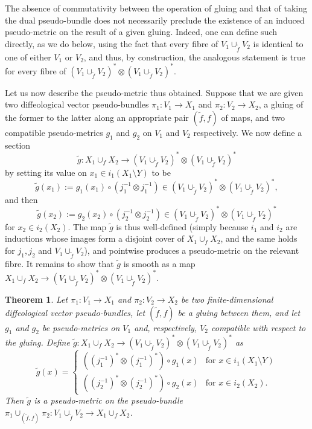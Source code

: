 \documentclass{article}
\newtheorem{thm}[lemma]{Theorem}
\begin{document}
The absence of commutativity between the operation of gluing and that of taking the dual pseudo-bundle does not necessarily preclude the existence of an induced pseudo-metric on the result of a given
gluing. Indeed, one can define such directly, as we do below, using the fact that every fibre of $V_1\cup_{\tilde{f}}V_2$ is identical to one of either $V_1$ or $V_2$, and thus, by construction, the analogous 
statement is true for every fibre of $(V_1\cup_{\tilde{f}}V_2)^*\otimes(V_1\cup_{\tilde{f}}V_2)^*$.

Let us now describe the pseudo-metric thus obtained. Suppose that we are given two diffeological vector pseudo-bundles $\pi_1:V_1\to X_1$ and $\pi_2:V_2\to X_2$, a gluing of the former to the latter along
an appropriate pair $(\tilde{f},f)$ of maps, and two compatible pseudo-metrics $g_1$ and $g_2$ on $V_1$ and $V_2$ respectively. We now define a section
$$\tilde{g}:X_1\cup_f X_2\to(V_1\cup_{\tilde{f}}V_2)^*\otimes(V_1\cup_{\tilde{f}}V_2)^*$$ by setting its value on $x_1\in i_1(X_1\setminus Y)$ to be
$$\tilde{g}(x_1):=g_1(x_1)\circ(j_1^{-1}\otimes j_1^{-1})\in (V_1\cup_{\tilde{f}}V_2)^*\otimes(V_1\cup_{\tilde{f}}V_2)^*,$$ and then
$$\tilde{g}(x_2):=g_2(x_2)\circ(j_2^{-1}\otimes j_2^{-1})\in (V_1\cup_{\tilde{f}}V_2)^*\otimes(V_1\cup_{\tilde{f}}V_2)^*$$ for $x_2\in i_2(X_2)$. The map $\tilde{g}$ is thus well-defined (simply because $i_1$ 
and $i_2$ are inductions whose images form a disjoint cover of $X_1\cup_f X_2$, and the same holds for $j_1,j_2$ and $V_1\cup_{\tilde{f}}V_2$), and pointwise produces a pseudo-metric on the relevant 
fibre. It remains to show that $\tilde{g}$ is smooth as a map $X_1\cup_f X_2\to(V_1\cup_{\tilde{f}}V_2)^*\otimes(V_1\cup_{\tilde{f}}V_2)^*$.

\begin{thm}\label{glued:pseudo:metric:noncommutative:thm}
Let $\pi_1:V_1\to X_1$ and $\pi_2:V_2\to X_2$ be two finite-dimensional diffeological vector pseudo-bundles, let $(\tilde{f},f)$ be a gluing between them, and let $g_1$ and $g_2$ be pseudo-metrics on 
$V_1$ and, respectively, $V_2$ compatible with respect to the gluing. Define $\tilde{g}:X_1\cup_f X_2\to(V_1\cup_{\tilde{f}}V_2)^*\otimes(V_1\cup_{\tilde{f}}V_2)^*$ as
$$\tilde{g}(x)=\left\{\begin{array}{ll}
((j_1^{-1})^*\otimes(j_1^{-1})^*)\circ g_1(x) & \mbox{for }x\in i_1(X_1\setminus Y) \\
((j_2^{-1})^*\otimes(j_2^{-1})^*)\circ g_2(x) & \mbox{for }x\in i_2(X_2).\end{array}\right.$$ Then $\tilde{g}$ is a pseudo-metric on the pseudo-bundle
$\pi_1\cup_{(\tilde{f},f)}\pi_2:V_1\cup_{\tilde{f}}V_2\to X_1\cup_f X_2$.
\end{thm}
\end{document}
